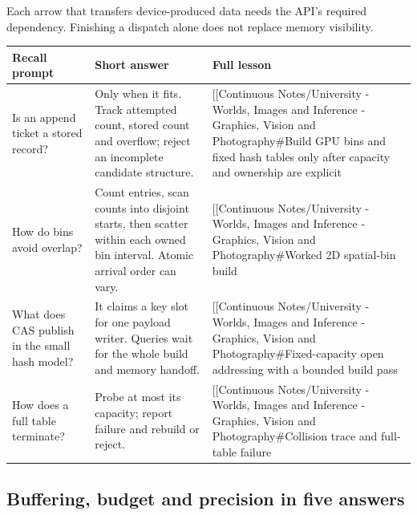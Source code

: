Each arrow that transfers device-produced data needs the API's required dependency. Finishing a dispatch alone does not replace memory visibility.

{\def\LTcaptype{none} %
\begin{longtable}[]{@{}
  >{\raggedright\arraybackslash}p{}
  >{\raggedright\arraybackslash}p{}
  >{\raggedright\arraybackslash}p{}@{}}
\toprule\noalign{}
\begin{minipage}[b]{\linewidth}\raggedright
Recall prompt
\end{minipage} & \begin{minipage}[b]{\linewidth}\raggedright
Short answer
\end{minipage} & \begin{minipage}[b]{\linewidth}\raggedright
Full lesson
\end{minipage} \\
\midrule\noalign{}
\endhead
\bottomrule\noalign{}
\endlastfoot
Is an append ticket a stored record? & Only when it fits. Track attempted count, stored count and overflow; reject an incomplete candidate structure. & {[}{[}Continuous Notes/University - Worlds, Images and Inference - Graphics, Vision and Photography\#Build GPU bins and fixed hash tables only after capacity and ownership are explicit \\
How do bins avoid overlap? & Count entries, scan counts into disjoint starts, then scatter within each owned bin interval. Atomic arrival order can vary. & {[}{[}Continuous Notes/University - Worlds, Images and Inference - Graphics, Vision and Photography\#Worked 2D spatial-bin build \\
What does CAS publish in the small hash model? & It claims a key slot for one payload writer. Queries wait for the whole build and memory handoff. & {[}{[}Continuous Notes/University - Worlds, Images and Inference - Graphics, Vision and Photography\#Fixed-capacity open addressing with a bounded build pass \\
How does a full table terminate? & Probe at most its capacity; report failure and rebuild or reject. & {[}{[}Continuous Notes/University - Worlds, Images and Inference - Graphics, Vision and Photography\#Collision trace and full-table failure \\
\end{longtable}
}

\subsection{Buffering, budget and precision in five answers}\label{appendix-a8f634b076b5-buffering-budget-and-precision-in-five-answers}

